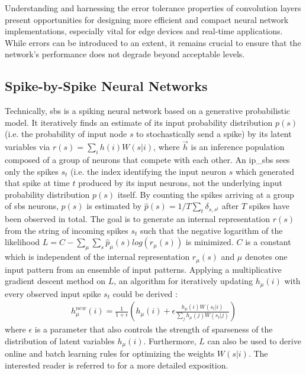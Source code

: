 Understanding and harnessing the error tolerance properties of convolution layers present opportunities for designing more efficient and compact neural network implementations, especially vital for edge devices and real-time applications. While errors can be introduced to an extent, it remains crucial to ensure that the network's performance does not degrade beyond acceptable levels.


\subsection{Spike-by-Spike Neural Networks} 

\label{sec:sbs}

Technically, \gls{sbs} is a spiking neural network based on a
generative probabilistic model. It iteratively finds an estimate of
its input probability distribution $p(s)$ (i.e. the probability of
input node $s$ to stochastically send a spike) by its latent variables
via $r(s) = \sum_i h(i) W(s|i)$, 
where $\vec{h}$ is an inference
population composed of a group of neurons that compete with each
other. An \gls{ip_sbs} sees only the spikes $s_t$ (i.e. the
index identifying the input neuron $s$ which generated that spike at
time $t$ produced by its input neurons, not the underlying input
probability distribution $p(s)$ itself. By counting the spikes
arriving at a group of \gls{sbs} neurons, $p(s)$ is estimated by
$\hat{p}(s) = 1/T \sum_t \delta_{s,s^t}$ after $T$ spikes have been
observed in total. The goal is to generate an internal representation
$r(s)$ from the string of incoming spikes $s_t$ such that the negative
logarithm of the likelihood
$L = C - \sum_\mu \sum_s \hat{p}_\mu(s) log\left( r_\mu(s) \right)$ is
minimized. $C$ is a constant which is independent of the internal
representation $r_\mu(s)$ and $\mu$ denotes one input pattern from an
ensemble of input patterns. Applying a multiplicative gradient descent
method on $L$, an algorithm for iteratively updating $h_\mu(i)$ with
every observed input spike $s_t$ could be derived
\cite{ernst2007efficient}:
\begin{eqnarray} \label{eq:sbs_update}
h_\mu^{new}(i) = \frac{1}{1+\epsilon} \left(h_\mu(i) + \epsilon \frac{h_\mu(i) W(s_t|i) }{\sum_j h_\mu(j) W(s_t|j)} \right) 
\end{eqnarray}
where $\epsilon$ is a parameter that also controls the strength of sparseness of the distribution of latent variables $h_\mu(i)$. Furthermore, $L$ can also be used to derive online and batch learning rules for optimizing the weights $W(s|i)$. The interested reader is referred to \cite{ernst2007efficient} for a more detailed exposition.


